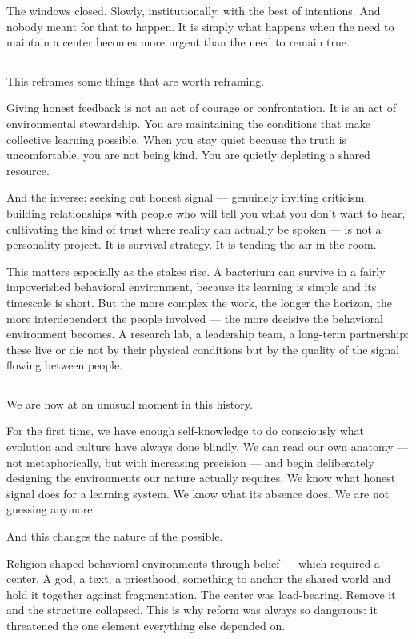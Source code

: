 \documentclass[12pt,letterpaper]{article}
\begin{document}
The windows closed. Slowly, institutionally, with the best of intentions. And nobody meant for that to happen. It is simply what happens when the need to maintain a center becomes more urgent than the need to remain true.

\begin{center}
\rule{\textwidth}{0.4pt}
\end{center}

This reframes some things that are worth reframing.

Giving honest feedback is not an act of courage or confrontation. It is an act of environmental stewardship. You are maintaining the conditions that make collective learning possible. When you stay quiet because the truth is uncomfortable, you are not being kind. You are quietly depleting a shared resource.

And the inverse: seeking out honest signal — genuinely inviting criticism, building relationships with people who will tell you what you don't want to hear, cultivating the kind of trust where reality can actually be spoken — is not a personality project. It is survival strategy. It is tending the air in the room.

This matters especially as the stakes rise. A bacterium can survive in a fairly impoverished behavioral environment, because its learning is simple and its timescale is short. But the more complex the work, the longer the horizon, the more interdependent the people involved — the more decisive the behavioral environment becomes. A research lab, a leadership team, a long-term partnership: these live or die not by their physical conditions but by the quality of the signal flowing between people.

\begin{center}
\rule{\textwidth}{0.4pt}
\end{center}

We are now at an unusual moment in this history.

For the first time, we have enough self-knowledge to do consciously what evolution and culture have always done blindly. We can read our own anatomy — not metaphorically, but with increasing precision — and begin deliberately designing the environments our nature actually requires. We know what honest signal does for a learning system. We know what its absence does. We are not guessing anymore.

And this changes the nature of the possible.

Religion shaped behavioral environments through belief — which required a center. A god, a text, a priesthood, something to anchor the shared world and hold it together against fragmentation. The center was load-bearing. Remove it and the structure collapsed. This is why reform was always so dangerous: it threatened the one element everything else depended on.
\end{document}
